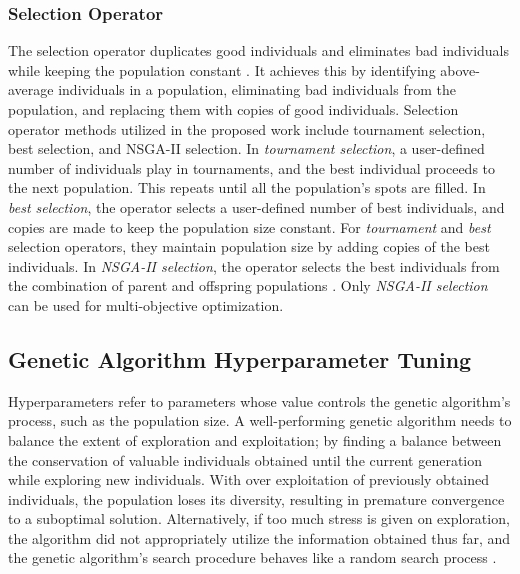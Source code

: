 \subsubsection{Selection Operator}
The selection operator duplicates good individuals and eliminates bad individuals 
while keeping the population constant \cite{deb_multi-objective_2001}. 
It achieves this by identifying above-average individuals in a population, 
eliminating bad individuals from the population, and replacing them with 
copies of good individuals.
Selection operator methods utilized in the proposed work include tournament 
selection, best selection, and \gls{NSGA-II} selection. 
In \textit{tournament selection}, a user-defined number of individuals play in 
tournaments, and the best individual proceeds to the next population.
This repeats until all the population's spots are filled. 
In \textit{best selection}, the operator selects a user-defined number of best 
individuals, and copies are made to keep the population size constant. 
For \textit{tournament} and \textit{best} selection operators, they maintain 
population size by adding copies of the best individuals. 
In \textit{NSGA-II selection}, the operator selects the best individuals 
from the combination of parent and offspring populations \cite{deb_fast_2002}.
Only \textit{NSGA-II selection} can be used for multi-objective optimization. 

\subsection{Genetic Algorithm Hyperparameter Tuning}
Hyperparameters refer to parameters whose value controls 
the genetic algorithm's process, such as the population size. 
A well-performing genetic algorithm needs to balance the extent of exploration and 
exploitation; by finding a balance between the conservation of 
valuable individuals obtained until the current generation while exploring new 
individuals. 
With over exploitation of previously obtained individuals, the population loses 
its diversity, resulting in premature convergence to a suboptimal solution. 
Alternatively, if too much stress is given on exploration, the algorithm did not 
appropriately utilize the information obtained thus far, and the genetic 
algorithm's search procedure behaves like a random search process 
\cite{deb_multi-objective_2001}. 

